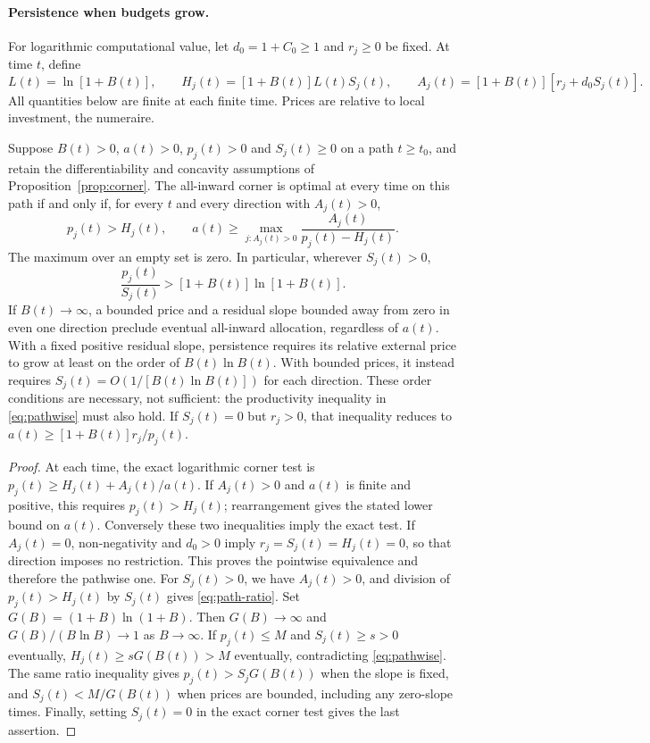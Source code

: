 \paragraph{Persistence when budgets grow.}

For logarithmic computational value, let $d_0=1+C_0\geq1$ and
$r_j\geq0$ be fixed. At time $t$, define
\[
 L(t)=\ln[1+B(t)],\qquad
 H_j(t)=[1+B(t)]L(t)S_j(t),\qquad
 A_j(t)=[1+B(t)][r_j+d_0S_j(t)].
\]
All quantities below are finite at each finite time. Prices are relative to
local investment, the numeraire.

\begin{proposition}
\label{prop:persistence}
Suppose $B(t)>0$, $a(t)>0$, $p_j(t)>0$ and $S_j(t)\geq0$ on a
path $t\geq t_0$, and retain the differentiability and concavity assumptions
of Proposition~\ref{prop:corner}. The all-inward corner is optimal at every
time on this path if and only if, for every $t$ and every direction with
$A_j(t)>0$,
\begin{equation}
 p_j(t)>H_j(t),\qquad
 a(t)\geq \max_{j:A_j(t)>0}
 \frac{A_j(t)}{p_j(t)-H_j(t)}.
 \label{eq:pathwise}
\end{equation}
The maximum over an empty set is zero. In particular, wherever $S_j(t)>0$,
\begin{equation}
 \frac{p_j(t)}{S_j(t)}>[1+B(t)]\ln[1+B(t)].
 \label{eq:path-ratio}
\end{equation}
If $B(t)\to\infty$, a bounded price and a residual slope bounded away
from zero in even one direction preclude eventual all-inward allocation,
regardless of $a(t)$. With a fixed positive residual slope, persistence
requires its relative external price to grow at least on the order of
$B(t)\ln B(t)$. With bounded prices, it instead requires
$S_j(t)=O(1/[B(t)\ln B(t)])$ for each direction. These order conditions
are necessary, not sufficient: the productivity inequality in
\eqref{eq:pathwise} must also hold. If $S_j(t)=0$ but $r_j>0$, that
inequality reduces to $a(t)\geq[1+B(t)]r_j/p_j(t)$.
\end{proposition}
\begin{proof}
At each time, the exact logarithmic corner test is
$p_j(t)\geq H_j(t)+A_j(t)/a(t)$. If $A_j(t)>0$ and $a(t)$ is
finite and positive, this requires $p_j(t)>H_j(t)$; rearrangement gives
the stated lower bound on $a(t)$. Conversely these two inequalities imply
the exact test. If $A_j(t)=0$, non-negativity and $d_0>0$ imply
$r_j=S_j(t)=H_j(t)=0$, so that direction imposes no restriction.
This proves the pointwise equivalence and therefore the pathwise one.
For $S_j(t)>0$, we have $A_j(t)>0$, and division of $p_j(t)>H_j(t)$
by $S_j(t)$ gives \eqref{eq:path-ratio}. Set
$G(B)=(1+B)\ln(1+B)$. Then $G(B)\to\infty$ and
$G(B)/(B\ln B)\to1$ as $B\to\infty$. If $p_j(t)\leq M$ and
$S_j(t)\geq s>0$ eventually, $H_j(t)\geq sG(B(t))>M$ eventually,
contradicting \eqref{eq:pathwise}. The same ratio inequality gives
$p_j(t)>S_jG(B(t))$ when the slope is fixed, and
$S_j(t)<M/G(B(t))$ when prices are bounded, including any zero-slope
times. Finally, setting $S_j(t)=0$ in the exact corner test gives the
last assertion.
\end{proof}
